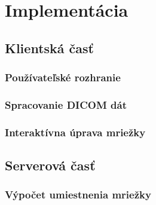 \chapter {Implementácia}

\section {Klientská časť}

\subsection {Používateľské rozhranie}

\subsection {Spracovanie DICOM dát}

\subsection {Interaktívna úprava mriežky}

\section {Serverová časť}

\subsection {Výpočet umiestnenia mriežky}